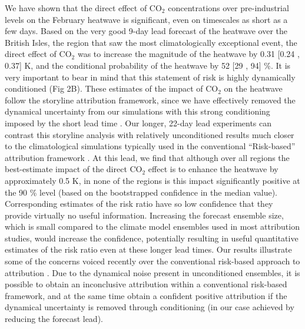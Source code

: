   We have shown that the direct effect of CO$_2$ concentrations over pre-industrial levels on the February heatwave is significant, even on timescales as short as a few days. Based on the very good 9-day lead forecast of the heatwave over the British Isles, the region that saw the most climatologically exceptional event, the direct effect of CO$_2$ was to increase the magnitude of the heatwave by 0.31 [0.24 , 0.37] K, and the conditional probability of the heatwave by 52 [29 , 94] \%. It is very important to bear in mind that this statement of risk is highly dynamically conditioned (Fig 2B). These estimates of the impact of CO$_2$ on the heatwave follow the storyline attribution framework, since we have effectively removed the dynamical uncertainty from our simulations with this strong conditioning imposed by the short lead time \citep{shepherd_common_2016,shepherd_storylines_2018,jezequel_behind_2018}. Our longer, 22-day lead experiments can contrast this storyline analysis with relatively unconditioned results much closer to the climatological simulations typically used in the conventional ``Risk-based'' attribution framework \citep{philip_protocol_2020,stott_human_2004}. At this lead, we find that although over all regions the best-estimate impact of the direct CO$_2$ effect is to enhance the heatwave by approximately 0.5 K, in none of the regions is this impact significantly positive at the 90 \% level (based on the bootstrapped confidence in the median value). Corresponding estimates of the risk ratio have so low confidence that they provide virtually no useful information. Increasing the forecast ensemble size, which is small compared to the climate model ensembles used in most attribution studies, would increase the confidence, potentially resulting in useful quantitative estimates of the risk ratio even at these longer lead times. Our results illustrate some of the concerns voiced recently over the conventional risk-based approach to attribution \citep{winsberg_severe_2020,shepherd_common_2016}. Due to the dynamical noise present in unconditioned ensembles, it is possible to obtain an inconclusive attribution within a conventional risk-based framework, and at the same time obtain a confident positive attribution if the dynamical uncertainty is removed through conditioning (in our case achieved by reducing the forecast lead).
  

